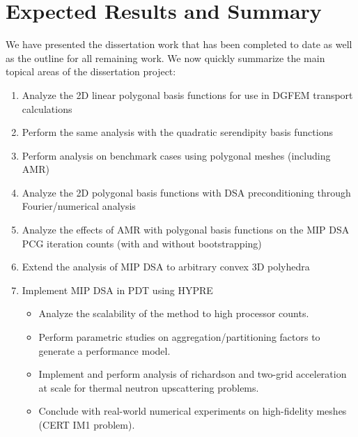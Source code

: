 \documentclass[11pt]{article}
\begin{document}
\section{Expected Results and Summary}
\label{sec::ER}

We have presented the dissertation work that has been completed to date as well as the outline for all remaining work. We now quickly summarize the main topical areas of the dissertation project:

\begin{enumerate}
	\item Analyze the 2D linear polygonal basis functions for use in DGFEM transport calculations
	\item Perform the same analysis with the quadratic serendipity basis functions
	\item Perform analysis on benchmark cases using polygonal meshes (including AMR)
	\item Analyze the 2D polygonal basis functions with DSA preconditioning through Fourier/numerical analysis
	\item Analyze the effects of AMR with polygonal basis functions on the MIP DSA PCG iteration counts (with and without bootstrapping)
	\item Extend the analysis of MIP DSA to arbitrary convex 3D polyhedra
	\item Implement MIP DSA in PDT using HYPRE
	\begin{itemize}
		\item Analyze the scalability of the method to high processor counts.
		\item Perform parametric studies on aggregation/partitioning factors to generate a performance model.
		\item Implement and perform analysis of richardson and two-grid acceleration at scale for thermal neutron upscattering problems.
		\item Conclude with real-world numerical experiments on high-fidelity meshes (CERT IM1 problem).
	\end{itemize}
\end{enumerate}



\end{document}
